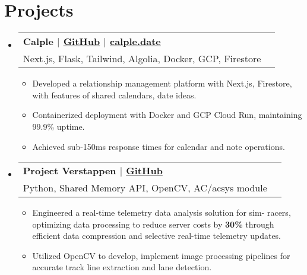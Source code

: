 \documentclass[letterpaper,11pt]{article}
\makeatletter
\newcommand{\resumeItem}[1]{
  \item{
    {#1}
  }
}
\newcommand{\resumeSubheading}[4]{
    \item
    \begin{tabular*}{0.985\textwidth}[t]{l@{\extracolsep{\fill}}r@{\hspace{-0.1in}}}
        {\textbf{#1}} & {#2} \\
        #3 &  #4 \\
    \end{tabular*}\vspace{-5pt}
}
\newcommand{\resumeSubHeadingListStart}{\begin{itemize}[leftmargin=0.00in, rightmargin=-0.2in, label={}]\vspace{3pt}}
\newcommand{\resumeSubHeadingListEnd}{\end{itemize}\vspace{-5pt}}
\newcommand{\resumeItemListStart}{\vspace{3pt}\begin{itemize}[leftmargin=0.15in, rightmargin=0.15in]}
\newcommand{\resumeItemListEnd}{\end{itemize}\vspace{-5pt}}
\makeatother
\begin{document}

\section{Projects}


\resumeSubHeadingListStart
\resumeSubheading
{\textbf{Calple} \textnormal{$|$ \href{https://github.com/juhun32/calple}{GitHub} $|$ \href{https://www.calple.date}{calple.date}}} {}
{{Next.js, Flask, Tailwind, Algolia, Docker, GCP, Firestore}}{}
\resumeItemListStart
\resumeItem{Developed a relationship management platform with Next.js, Firestore, with features of shared calendars, date ideas.}
\resumeItem{Containerized deployment with Docker and GCP Cloud Run, maintaining 99.9\% uptime.}
\resumeItem{Achieved sub-150ms response times for calendar and note operations.}
\resumeItemListEnd
\resumeSubHeadingListEnd

\resumeSubHeadingListStart
\resumeSubheading
{\textbf{Project Verstappen} \textnormal{$|$ \href{https://github.com/juhun32/project-verstappen}{GitHub}}} {}
{{Python, Shared Memory API, OpenCV, AC/acsys module}}{}
\resumeItemListStart
\resumeItem{Engineered a real-time telemetry data analysis solution for sim- racers, optimizing data processing to reduce server costs by \textbf{30\%} through efficient data compression and selective real-time telemetry updates.}
\resumeItem{Utilized OpenCV to develop, implement image processing pipelines for accurate track line extraction and lane detection.}
\resumeItemListEnd
\resumeSubHeadingListEnd
\end{document}
